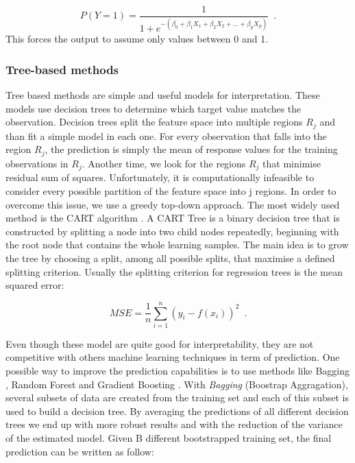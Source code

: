 \begin{equation}
    P(Y=1) = \frac{1}{1 + e^{- (\beta_0 + \beta_1X_1 + \beta_2X_2 + \ldots + \beta_pX_p)} }
    \enspace.
\end{equation}
This forces the output to assume only values between 0 and 1.

\subsubsection{Tree-based methods} \label{Tree-based methods}

Tree based methods are simple and useful models for interpretation. These models use decision trees to determine which target value matches the observation. Decision trees split the feature space into multiple regions $R_j$ and than fit a simple model in each one. For every observation that falls into the region $R_j$, the prediction is simply the mean of response values for the training observations in $R_j$. Another time, we look for the regions $R_j$ that minimise residual sum of squares. Unfortunately, it is computationally infeasible to consider every possible partition of the feature space into j regions. In order to overcome this issue, we use a greedy top-down approach. The most widely used method is the CART algorithm \citep{breiman2017classification}. A CART Tree is a binary decision tree that is constructed by splitting a node into two child nodes repeatedly, beginning with the root node that contains the whole learning samples. The main idea is to grow the tree by choosing a split, among all possible splits, that maximise a defined splitting criterion. Usually the splitting criterion for regression trees is the mean squared error:

\begin{equation}
    MSE = \frac{1}{n}\sum_{i=1}^{n}(y_i -f(x_i))^2
    \enspace.
\end{equation}

Even though these model are quite good for interpretability, they are not competitive with others machine learning techniques in term of prediction. One possible way to improve the prediction capabilities is to use methods like Bagging \citep{breiman1996bagging}, Random Forest \citep{breiman2001random} and Gradient Boosting \citep{friedman2001greedy}.
With \textit{Bagging} (Boostrap Aggragation), several subsets of data are created from the training set and each of this subset is used to build a decision tree. By averaging the predictions of all different decision trees we end up with more robust results and with the reduction of the variance of the estimated model. Given B different bootstrapped training set, the final prediction can be written as follow:

